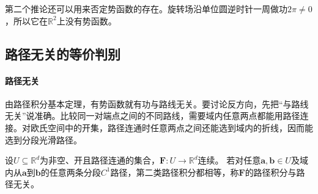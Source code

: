 第二个推论还可以用来否定势函数的存在。旋转场沿单位圆逆时针一周做功$2\pi\neq0$，所以它在$\mathbb R^2$上没有势函数。

\subsection{路径无关的等价判别}

\paragraph{路径无关}

由路径积分基本定理，有势函数就有功与路线无关。要讨论反方向，先把“与路线无关”说准确。比较同一对端点之间的不同路线，需要域内任意两点都能用路径连接。对欧氏空间中的开集，路径连通时任意两点之间还能选到域内的折线，因而能选到分段光滑路径。
\begin{definition}[路径无关]
设$U\subseteq\mathbb R^d$为非空、开且路径连通的集合，$\bm F:U\to\mathbb R^d$连续。
若对任意$\bm a,\bm b\in U$及域内从$\bm a$到$\bm b$的任意两条分段$C^1$路径，第二类路径积分都相等，称$\bm F$的路径积分与路径无关。
\end{definition}

